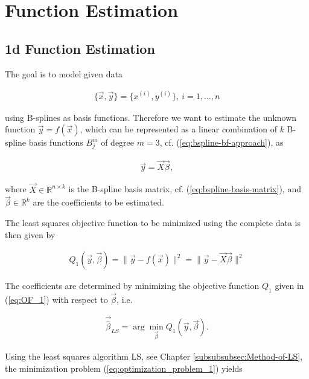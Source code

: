 \documentclass[10pt,a4paper]{report}
\begin{document}
\section{Function Estimation}

\subsection{1d Function Estimation} \label{subsec:1d-function-estimation}

The goal is to model given data

\begin{align} \label{eq:data}
	\{\vec{x}, \vec{y}\} = \{x^{(i)}, y^{(i)}\}, \ i = 1, \dots, n 
\end{align}

using B-splines as basis functions. Therefore we want to estimate the unknown function $\vec{y} = f(\vec{x})$, which can be represented as a linear combination of $k$ B-spline basis functions $B_j^m$ of degree $m=3$, cf. (\ref{eq:bspline-bf-approach}), as

\begin{align} \label{eq:basis_function_approach}
	\vec{y} = \vec{X} \vec{\beta},
\end{align}

where $\vec{X} \in \mathbb{R}^{n\times k}$ is the B-spline basis matrix, cf. (\ref{eq:bspline-basis-matrix}), and $\vec{\beta} \in \mathbb{R}^k$ are the coefficients to be estimated. 

The least squares objective function to be minimized using the complete data is then given by

\begin{align} \label{eq:OF_1}
	Q_1(\vec{y}, \vec{\beta}) = \lVert \vec{y} - f(\vec{x}) \rVert^2 = \lVert \vec{y} - \vec{X}\vec{\beta} \rVert^2 
\end{align}	

The coefficients are determined by minimizing the objective function $Q_1$ given in (\ref{eq:OF_1}) with respect to $\vec{\beta}$, i.e.

\begin{align}\label{eq:optimization_problem_1}
	\vec{\hat \beta}_{LS} = \arg \min_{\vec{\beta}} Q_1(\vec{y}, \vec{\beta}).
\end{align}

Using the least squares algorithm LS, see Chapter \ref{subsubsubsec:Method-of-LS}, the minimization problem (\ref{eq:optimization_problem_1}) yields 
\end{document}
